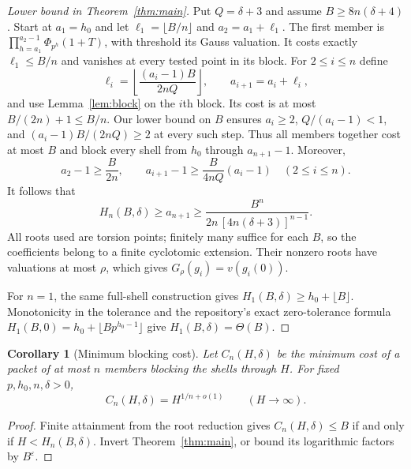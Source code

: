 \documentclass[11pt]{article}
\newtheorem{corollary}[theorem]{Corollary}
\theoremstyle{remark}\newtheorem{remark}[theorem]{Remark}
\begin{document}
\begin{proof}[Lower bound in Theorem~\ref{thm:main}]
Put $Q=\delta+3$ and assume $B\ge8n(\delta+4)$.
Start at $a_1=h_0$ and let $\ell_1=\lfloor B/n\rfloor$ and $a_2=a_1+\ell_1$.
The first member is
$\prod_{h=a_1}^{a_2-1}\Phi_{p^h}(1+T)$, with threshold its Gauss valuation.
It costs exactly $\ell_1\le B/n$ and vanishes at every tested point in its block.
For $2\le i\le n$ define
\[
 \ell_i=\left\lfloor\frac{(a_i-1)B}{2nQ}\right\rfloor,
 \qquad a_{i+1}=a_i+\ell_i,
\]
and use Lemma~\ref{lem:block} on the $i$th block. Its cost is at most
$B/(2n)+1\le B/n$. Our lower bound on $B$ ensures $a_i\ge2$, $Q/(a_i-1)<1$,
and $(a_i-1)B/(2nQ)\ge2$ at every such step. Thus all members together cost at most $B$
and block every shell from $h_0$ through $a_{n+1}-1$.
Moreover,
\[
 a_2-1\ge\frac{B}{2n},\qquad
 a_{i+1}-1\ge\frac{B}{4nQ}(a_i-1)\quad(2\le i\le n).
\]
It follows that
\begin{equation}\label{eq:lower}
 H_n(B,\delta)\ge a_{n+1}
 \ge\frac{B^n}{2n\,[4n(\delta+3)]^{n-1}}.
\end{equation}
All roots used are torsion points; finitely many suffice for each $B$, so the coefficients
belong to a finite cyclotomic extension. Their nonzero roots have valuations at most $\rho$,
which gives $G_\rho(g_i)=v(g_i(0))$.

For $n=1$, the same full-shell construction gives $H_1(B,\delta)\ge h_0+\lfloor B\rfloor$.
Monotonicity in the tolerance and the repository's exact zero-tolerance formula~\cite[Theorem \texttt{cost:thm:cardinality}]{proveit-cost}
$H_1(B,0)=h_0+\lfloor Bp^{h_0-1}\rfloor$ give $H_1(B,\delta)=\Theta(B)$.
\end{proof}

\begin{corollary}[Minimum blocking cost]
Let $C_n(H,\delta)$ be the minimum cost of a packet of at most $n$ members blocking
the shells through $H$. For fixed $p,h_0,n,\delta>0$,
\[
 C_n(H,\delta)=H^{1/n+o(1)}\qquad(H\to\infty).
\]
\end{corollary}
\begin{proof}
Finite attainment from the root reduction gives
$C_n(H,\delta)\le B$ if and only if $H<H_n(B,\delta)$.
Invert Theorem~\ref{thm:main}, or bound its logarithmic factors by $B^\varepsilon$.
\end{proof}
\end{document}
